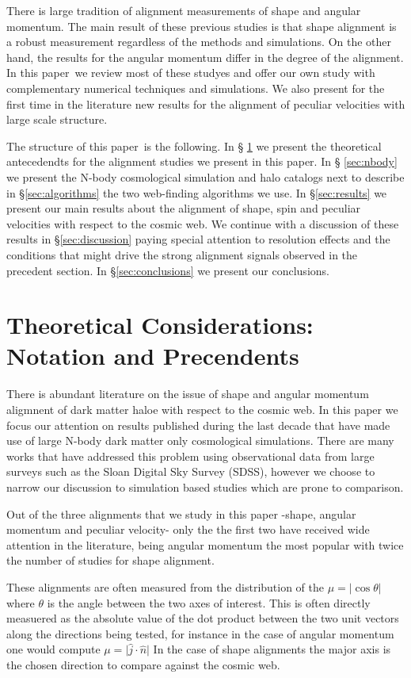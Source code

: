 \documentclass[useAMS,usenatbib]{mn2e}
\newcommand{\documentname}{paper~}
\begin{document}
There is large tradition of alignment measurements of shape and
angular momentum. The main result of these previous studies is that shape
alignment is a robust measurement regardless of the methods and
simulations. On the other hand, the results for the angular momentum
differ in the degree of the alignment. In this \documentname we review
most of these studyes and offer our own study with complementary
numerical techniques and simulations.  We also present for the first
time in the literature new results for the alignment of peculiar velocities
with large scale structure.


The structure of this \documentname is the following. In \S
\ref{sec:theory} we present the theoretical antecedendts for the
alignment studies we present in this paper. In \S
\ref{sec:nbody} we present the N-body
cosmological simulation and halo catalogs next to describe in
\S\ref{sec:algorithms} the two web-finding algorithms we use. In
\S\ref{sec:results} we present our main results about the alignment
of shape, spin and peculiar velocities with respect to the cosmic
web. We continue with a discussion of these results in
\S\ref{sec:discussion} paying special attention to resolution effects
and the conditions that might drive the strong alignment signals
observed in the precedent section. In \S\ref{sec:conclusions} we
present our conclusions.


\section{Theoretical Considerations: Notation and Precendents}
\label{sec:theory}

There is abundant literature on the issue of shape and angular momentum
aligmnent of dark matter haloe with respect to the cosmic web. In this
paper we focus our attention on results published during the last
decade that have made use of large N-body dark matter only
cosmological simulations. There are many works that have addressed
this problem using observational data from large surveys such as the
Sloan Digital Sky Survey (SDSS), however we choose to narrow our
discussion to simulation based studies which are prone to comparison.

Out of the three alignments that we study in this paper -shape,
angular momentum and peculiar velocity- only the the first two have
received wide attention in the literature, being angular momentum the
most popular with twice the number of studies for shape alignment.

These alignments are often measured from the distribution of the
$\mu=\vert\cos\theta\vert$ where $\theta$ is the angle between the two axes of
interest. This is often directly measuered as the absolute value of
the dot product between the two unit vectors along the directions
being tested, for instance in the case of angular momentum one would compute
$\mu=\vert\hat{j}\cdot\hat{n}\vert$ In the case of shape alignments the major
axis is the chosen direction to compare against the cosmic web. 
\end{document}
